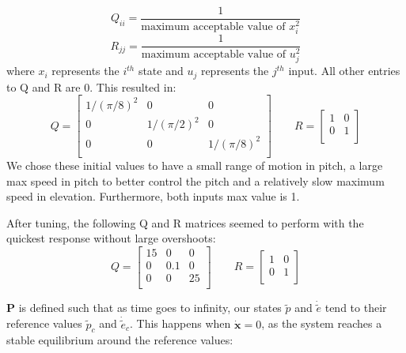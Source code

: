 \begin{equation}
Q_{ii} = \frac{1}{\text{maximum acceptable value of }x_i^2}
\end{equation}
\begin{equation}
R_{jj} = \frac{1}{\text{maximum acceptable value of }u_j^2}
\end{equation}
 where $x_i$ represents the $i^{th}$ state and $u_j$ represents the $j^{th}$ input. All other entries to Q and R are 0. This resulted in:
\begin{equation}
Q = 
	\begin{bmatrix}
    1/(\pi/8)^2 & 0          & 0 \\
    0 &          1/(\pi/2)^2 & 0 \\
    0 &          0          & 1/(\pi/8)^2 \\
  \end{bmatrix}
	\qquad
R =
	\begin{bmatrix}
    1 & 0 \\
    0 & 1 \\
  \end{bmatrix}
\end{equation}
We chose these initial values to have a small range of motion in pitch, a large max speed in pitch to better control the pitch and a relatively slow maximum speed in elevation. Furthermore, both inputs max value is 1.

After tuning, the following Q and R matrices seemed to perform with the quickest response without large overshoots:
\begin{equation}
Q = 
	\begin{bmatrix}
    15 & 0   & 0 \\
    0  & 0.1 & 0 \\
    0  & 0   & 25 \\
  \end{bmatrix}
	\qquad
R =
	\begin{bmatrix}
    1 & 0 \\
    0 & 1 \\
  \end{bmatrix}
\end{equation}



$\boldsymbol{P}$ is defined such that as time goes to infinity, our states $\tilde{p}$ and $\dot{\tilde{e}}$ tend to their reference values $\tilde{p}_c$ and $\dot{\tilde{e}}_c$. This happens when
$\dot{\boldsymbol{x}} = 0$, as the system reaches a stable equilibrium
around the reference values:

